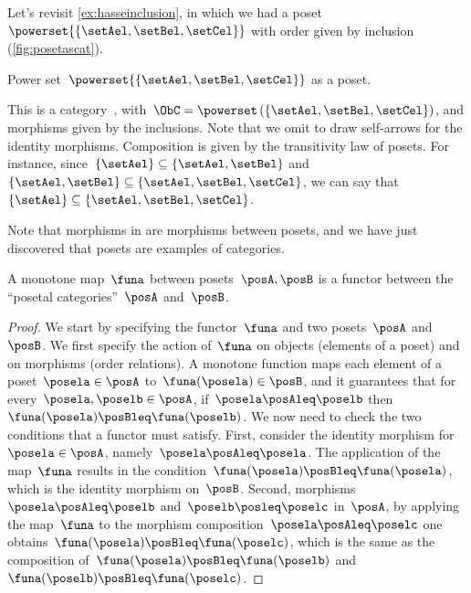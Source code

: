 \begin{example}
    Let's revisit \cref{ex:hasseinclusion}, in which we had a poset~$\powerset{\{\setAel,\setBel,\setCel\}}$ with order given by inclusion (\cref{fig:posetascat}).

    \begin{marginfigure}
        \centering
        \caption{Power set~$\powerset{\{\setAel,\setBel,\setCel\}}$ as a poset. \label{fig:posetascat}}
    \end{marginfigure}

    This is a category~\CatC, with~$\ObC=\powerset\left(\{\setAel,\setBel,\setCel\}\right)$, and morphisms given by the inclusions.
    Note that we omit to draw self-arrows for the identity morphisms.
    Composition is given by the transitivity law of posets.
    For instance, since~$\{\setAel\}\subseteq \{\setAel,\setBel\}$ and~$\{\setAel,\setBel\} \subseteq \{\setAel,\setBel,\setCel\}$, we can say that~$\{\setAel\}\subseteq \{\setAel,\setBel,\setCel\}$.
\end{example}



Note that morphisms in \Pos are morphisms between posets, and we have just discovered that posets are examples of categories.
\begin{lemma}
    \label{lem:posetfunctor}
    A monotone map~$\funa$ between posets~$\posA,\posB$ is a functor between the ``posetal categories''~$\posA$ and~$\posB$.
\end{lemma}
\begin{proof}
    We start by specifying the functor~$\funa$ and two posets~$\posA$ and~$\posB$.
    We first specify the action of~$\funa$ on objects (elements of a poset) and on morphisms (order relations).
    A monotone function maps each element of a poset~$\posela\in \posA$ to~$\funa(\posela) \in \posB$, and it guarantees that for every~$\posela,\poselb\in \posA$, if~$\posela\posAleq \poselb$ then~$\funa(\posela)\posBleq \funa(\poselb)$.
    We now need to check the two conditions that a functor must satisfy.
    First, consider the identity morphism for~$\posela\in \posA$, namely~$\posela \posAleq \posela$.
    The application of the map~$\funa$ results in the condition~$\funa(\posela)\posBleq \funa(\posela)$, which is the identity morphism on~$\posB$.
    Second, morphisms~$\posela\posAleq \poselb$ and~$\poselb\posleq \poselc$ in~$\posA$, by applying the map~$\funa$ to the morphism composition~$\posela\posAleq \poselc$ one obtains~$\funa(\posela)\posBleq \funa(\poselc)$, which is the same as the composition of~$\funa(\posela)\posBleq \funa(\poselb)$ and~$\funa(\poselb)\posBleq \funa(\poselc)$.
\end{proof}

